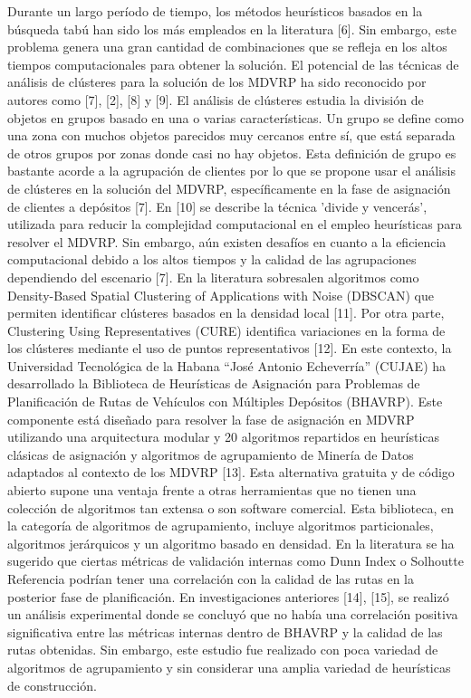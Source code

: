 Durante un largo período de tiempo, los métodos heurísticos basados en la búsqueda tabú han sido los más empleados en la literatura [6]. Sin embargo, este problema genera una gran cantidad de combinaciones que se refleja en los altos tiempos computacionales para obtener la solución. El potencial de las técnicas de análisis de clústeres para la solución de los MDVRP ha sido reconocido por autores como [7], [2], [8] y [9]. El análisis de clústeres estudia la división de objetos en grupos basado en una o varias características. Un grupo se define como una zona con muchos objetos parecidos muy cercanos entre sí, que está separada de otros grupos por zonas donde casi no hay objetos. Esta definición de grupo es bastante acorde a la agrupación de clientes por lo que se propone usar el análisis de clústeres en la solución del MDVRP, específicamente en la fase de asignación de clientes a depósitos [7]. En [10] se describe la técnica 'divide y vencerás', utilizada para reducir la complejidad computacional en el empleo heurísticas para resolver el MDVRP.
Sin embargo, aún existen desafíos en cuanto a la eficiencia computacional debido a los altos tiempos y la calidad de las agrupaciones dependiendo del escenario [7]. En la literatura sobresalen algoritmos como Density-Based Spatial Clustering of Applications with Noise (DBSCAN) que permiten identificar clústeres basados en la densidad local [11]. Por otra parte, Clustering Using Representatives (CURE) identifica variaciones en la forma de los clústeres mediante el uso de puntos representativos [12]. 
En este contexto, la Universidad Tecnológica de la Habana “José Antonio Echeverría” (CUJAE) ha desarrollado la Biblioteca de Heurísticas de Asignación para Problemas de Planificación de Rutas de Vehículos con Múltiples Depósitos (BHAVRP). Este componente está diseñado para resolver la fase de asignación en MDVRP utilizando una arquitectura modular y 20 algoritmos repartidos en heurísticas clásicas de asignación y algoritmos de agrupamiento de Minería de Datos adaptados al contexto de los MDVRP [13]. Esta alternativa gratuita y de código abierto supone una ventaja frente a otras herramientas que no tienen una colección de algoritmos tan extensa o son software comercial. 
Esta biblioteca, en la categoría de algoritmos de agrupamiento, incluye algoritmos particionales, algoritmos jerárquicos y un algoritmo basado en densidad. En la literatura se ha sugerido que ciertas métricas de validación internas como Dunn Index o Solhoutte Referencia podrían tener una correlación con la calidad de las rutas en la posterior fase de planificación. En investigaciones anteriores [14], [15], se realizó un análisis experimental donde se concluyó que no había una correlación positiva significativa entre las métricas internas dentro de BHAVRP y la calidad de las rutas obtenidas. Sin embargo, este estudio fue realizado con poca variedad de algoritmos de agrupamiento y sin considerar una amplia variedad de heurísticas de construcción.
